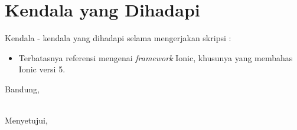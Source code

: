 \documentclass[a4paper,twoside]{article}
\begin{document}
\section{Kendala yang Dihadapi}
Kendala - kendala yang dihadapi selama mengerjakan skripsi :
\begin{itemize}
	\item Terbatasnya referensi mengenai \textit{framework} Ionic, khusunya yang membahas Ionic versi 5.
\end{itemize}

\vspace{1cm}
\centering Bandung, \tanggal\\
\vspace{2cm} \nama \\ 
\vspace{1cm}

Menyetujui, \\
\end{document}
